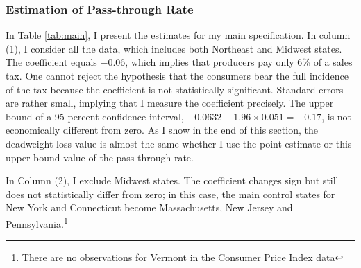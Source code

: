 \documentclass[12pt]{article}
\begin{document}
	
	
	
	
	\subsubsection{Estimation of Pass-through Rate}
	
	
	In Table \ref{tab:main}, I present the estimates for my main specification. In column (1), I consider all the data, which includes both Northeast and Midwest states.  The coefficient equals $-0.06$, which implies that producers pay only 6\% of a sales tax. One cannot reject the hypothesis that the consumers bear the full incidence of the tax because the coefficient is not statistically significant. %
	Standard errors are rather small, implying that I measure the coefficient precisely. The upper bound of a 95-percent confidence interval, $-0.0632-1.96\times0.051=-0.17$, is not economically different from zero.   As I show in the end of this section, the deadweight loss value is almost the same whether I use the point estimate or this upper bound value of the pass-through rate. 
	
	In Column (2), I exclude Midwest states. The coefficient changes sign but still does not statistically differ from zero; in this case, the main control states for New York and Connecticut become Massachusetts, New Jersey and Pennsylvania.\footnote{There are no observations for Vermont in the Consumer Price Index data}
	
\end{document}
